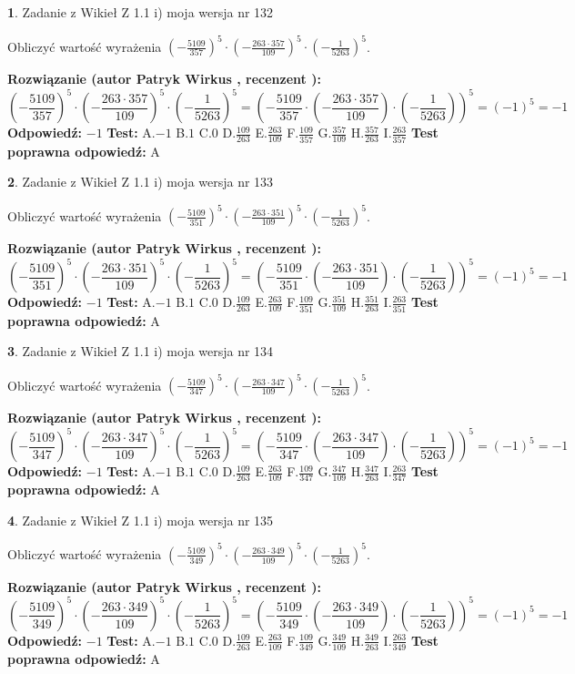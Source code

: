 \documentclass[12pt, a4paper]{article}
\theoremstyle{definition} %
\newtheorem{zad}{}
\newcommand{\zadStart}[1]{\begin{zad}#1\newline}
\newcommand{\zadStop}{\end{zad}}
\newcommand{\rozwStart}[2]{\noindent \textbf{Rozwiązanie (autor #1 , recenzent #2): }\newline}
\newcommand{\rozwStop}{\newline}
\newcommand{\odpStart}{\noindent \textbf{Odpowiedź:}\newline}
\newcommand{\odpStop}{\newline}
\newcommand{\testStart}{\noindent \textbf{Test:}\newline}
\newcommand{\testStop}{\newline}
\newcommand{\kluczStart}{\noindent \textbf{Test poprawna odpowiedź:}\newline}
\newcommand{\kluczStop}{\newline}
\begin{document}
\zadStart{Zadanie z Wikieł Z 1.1 i) moja wersja nr 132}

Obliczyć wartość wyrażenia $(-\frac{5109}{357})^{5} \cdot (-\frac{263 \cdot 357}{109})^{5} \cdot (-\frac{1}{5263})^{5}$.
\zadStop
\rozwStart{Patryk Wirkus}{}
$$(-\frac{5109}{357})^{5} \cdot (-\frac{263 \cdot 357}{109})^{5} \cdot (-\frac{1}{5263})^{5} = (-\frac{5109}{357} \cdot (-\frac{263 \cdot 357}{109}) \cdot (-\frac{1}{5263}))^{5} = (-1)^{5} = -1$$
\rozwStop
\odpStart
$-1$
\odpStop
\testStart
A.$-1$ B.$1$ C.$0$ D.$\frac{109}{263}$ E.$\frac{263}{109}$
F.$\frac{109}{357}$ G.$\frac{357}{109}$
H.$\frac{357}{263}$
I.$\frac{263}{357}$
\testStop
\kluczStart
A
\kluczStop



\zadStart{Zadanie z Wikieł Z 1.1 i) moja wersja nr 133}

Obliczyć wartość wyrażenia $(-\frac{5109}{351})^{5} \cdot (-\frac{263 \cdot 351}{109})^{5} \cdot (-\frac{1}{5263})^{5}$.
\zadStop
\rozwStart{Patryk Wirkus}{}
$$(-\frac{5109}{351})^{5} \cdot (-\frac{263 \cdot 351}{109})^{5} \cdot (-\frac{1}{5263})^{5} = (-\frac{5109}{351} \cdot (-\frac{263 \cdot 351}{109}) \cdot (-\frac{1}{5263}))^{5} = (-1)^{5} = -1$$
\rozwStop
\odpStart
$-1$
\odpStop
\testStart
A.$-1$ B.$1$ C.$0$ D.$\frac{109}{263}$ E.$\frac{263}{109}$
F.$\frac{109}{351}$ G.$\frac{351}{109}$
H.$\frac{351}{263}$
I.$\frac{263}{351}$
\testStop
\kluczStart
A
\kluczStop



\zadStart{Zadanie z Wikieł Z 1.1 i) moja wersja nr 134}

Obliczyć wartość wyrażenia $(-\frac{5109}{347})^{5} \cdot (-\frac{263 \cdot 347}{109})^{5} \cdot (-\frac{1}{5263})^{5}$.
\zadStop
\rozwStart{Patryk Wirkus}{}
$$(-\frac{5109}{347})^{5} \cdot (-\frac{263 \cdot 347}{109})^{5} \cdot (-\frac{1}{5263})^{5} = (-\frac{5109}{347} \cdot (-\frac{263 \cdot 347}{109}) \cdot (-\frac{1}{5263}))^{5} = (-1)^{5} = -1$$
\rozwStop
\odpStart
$-1$
\odpStop
\testStart
A.$-1$ B.$1$ C.$0$ D.$\frac{109}{263}$ E.$\frac{263}{109}$
F.$\frac{109}{347}$ G.$\frac{347}{109}$
H.$\frac{347}{263}$
I.$\frac{263}{347}$
\testStop
\kluczStart
A
\kluczStop



\zadStart{Zadanie z Wikieł Z 1.1 i) moja wersja nr 135}

Obliczyć wartość wyrażenia $(-\frac{5109}{349})^{5} \cdot (-\frac{263 \cdot 349}{109})^{5} \cdot (-\frac{1}{5263})^{5}$.
\zadStop
\rozwStart{Patryk Wirkus}{}
$$(-\frac{5109}{349})^{5} \cdot (-\frac{263 \cdot 349}{109})^{5} \cdot (-\frac{1}{5263})^{5} = (-\frac{5109}{349} \cdot (-\frac{263 \cdot 349}{109}) \cdot (-\frac{1}{5263}))^{5} = (-1)^{5} = -1$$
\rozwStop
\odpStart
$-1$
\odpStop
\testStart
A.$-1$ B.$1$ C.$0$ D.$\frac{109}{263}$ E.$\frac{263}{109}$
F.$\frac{109}{349}$ G.$\frac{349}{109}$
H.$\frac{349}{263}$
I.$\frac{263}{349}$
\testStop
\kluczStart
A
\kluczStop
\end{document}
